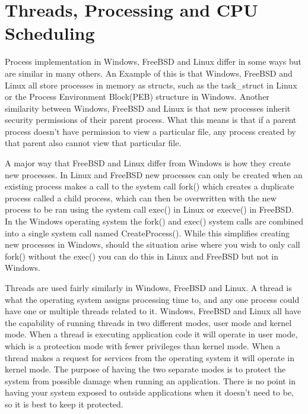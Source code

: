\documentclass[10pt,serif,draftclsnofoot,onecolumn]{IEEEtran}
\begin{document}
\section{Threads, Processing and CPU Scheduling}
	\par
	Process implementation in Windows, FreeBSD and Linux differ in some ways but are similar in many others. An Example of this is that Windows, FreeBSD and Linux all store processes in memory as structs, such as the task\_struct in Linux\cite{2} or the Process Environment Block(PEB) structure in Windows\cite{3}. Another similarity between Windows, FreeBSD and Linux is that new processes inherit security permissions of their parent process\cite{4}. What this means is that if a parent process doesn't have permission to view a particular file, any process created by that parent also cannot view that particular file.
	\newline
	\par
	A major way that FreeBSD and Linux differ from Windows is how they create new processes. In Linux and FreeBSD new processes can only be created when an existing process makes a call to the system call fork() which creates a duplicate process called a child process, which can then be overwritten with the new process to be ran using the system call exec() in Linux or execve() in FreeBSD\cite{1}. In the Windows operating system the fork() and exec() system calls are combined into a single system call named CreateProcess()\cite{4}. While this simplifies creating new processes in Windows, should the situation arise where you wish to only call fork() without the exec() you can do this in Linux and FreeBSD but not in Windows.
	\newline
	\par
	Threads are used fairly similarly in Windows, FreeBSD and Linux. A thread is what the operating system assigns processing time to, and any one process could have one or multiple threads related to it. Windows, FreeBSD and Linux all have the capability of running threads in two different modes, user mode and kernel mode\cite{1}. When a thread is executing application code it will operate in user mode, which is a protection mode with fewer privileges than kernel mode. When a thread makes a request for services from the operating system it will operate in kernel mode. The purpose of having the two separate modes is to protect the system from possible damage when running an application. There is no point in having your system exposed to outside applications when it doesn't need to be, so it is best to keep it protected.
\end{document}
